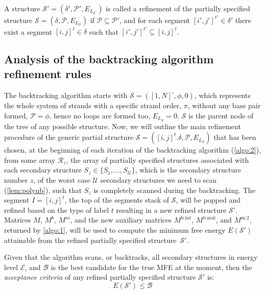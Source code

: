 \begin{Definition}
	A structure $\mathcal{S}' = (\delta',\mathcal{P}',E_{L_{\mathcal{S}'}})$ is called a refinement of the partially specified structure $\mathcal{S} = (\delta,\mathcal{P},E_{L_\mathcal{S}})$ if $\mathcal{P} \subseteq \mathcal{P}'$, and for each segment $[i',j']^{t'} \in \delta'$ there exist a segment $[i,j]^t \in \delta$ such that $[i',j']^{t'} \subseteq [i,j]^t$.
\end{Definition}

\subsection{Analysis of the backtracking algorithm refinement rules}\label{sec:backhigh}


The backtracking algorithm  starts with $\mathcal{S} = ([1,N]^\square, \phi,0)$, which represents the whole system of strands with a specific strand order, $\pi$, without any base pair formed, $\mathcal{P} = \phi$, hence no loops are formed too, $E_{L_\mathcal{S}} = 0$. $\mathcal{S}$ is the parent node of the tree of any possible structure. 
Now, we will outline the main refinement procedure of the generic partial structure $\mathcal{S} = ([i,j]^t.\delta, \mathcal{P}, E_{L_{\mathcal{S}}})$ that has been chosen, at the beginning of each iteration of the backtracking algorithm ({\cref{algo:2}}), 
from some array $\mathcal{R}_{z}$, the array of partially specified structures associated with each secondary structure $S_{z} \in \{S_1, \ldots, S_\mathcal{U}\}$, which is the secondary structure number $z$, of the worst case $\mathcal{U}$ secondary structures we need to scan (\cref{lem:polyub}), such that $S_z$ is completely scanned during the backtracking. 
The segment $I = [i,j]^t$, the top of the
segments stack of $\mathcal{S}$, will be popped  and  refined based on the type of  label $t$ resulting in a new refined structure $\mathcal{S}'$. Matrices $M$, $M^b$, $M^m$, and the new auxiliary matrices $M^\text{b:int}$, $M^\text{b:mul}$, and $M^\text{m:2}$, returned by  \cref{algo:1}, will be used to compute the minimum free energy $E(\mathcal{S}')$ attainable from  the refined partially specified structure~$\mathcal{S}'$.



Given that the algorithm  scans, or backtracks, all secondary structures in energy level $\mathcal{E}$, and $\mathcal{B}$ is the best candidate for the true MFE at the moment, then the \emph{acceptance criteria} of any refined partially specified structure $\mathcal{S}'$ is: 
\begin{equation}
	E(\mathcal{S}') \leq    \mathcal{B}
\end{equation}

